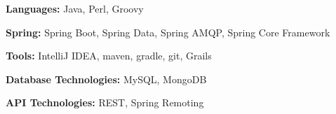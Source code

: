 \begin{cventries}
    {} %
    {} %
    {} %
    {\vspace{-0.5mm}
      \begin{cvitems} %
        \item {\textbf{Languages:} Java, Perl, Groovy}
        \item {\textbf{Spring:} Spring Boot, Spring Data, Spring AMQP, Spring Core Framework}
        \item {\textbf{Tools:} IntelliJ IDEA, maven, gradle, git, Grails}
        \item {\textbf{Database Technologies:} MySQL, MongoDB}
        \item {\textbf{API Technologies:} REST, Spring Remoting}
      \end{cvitems}
    }

\end{cventries}



\vspace{-1.00mm}


